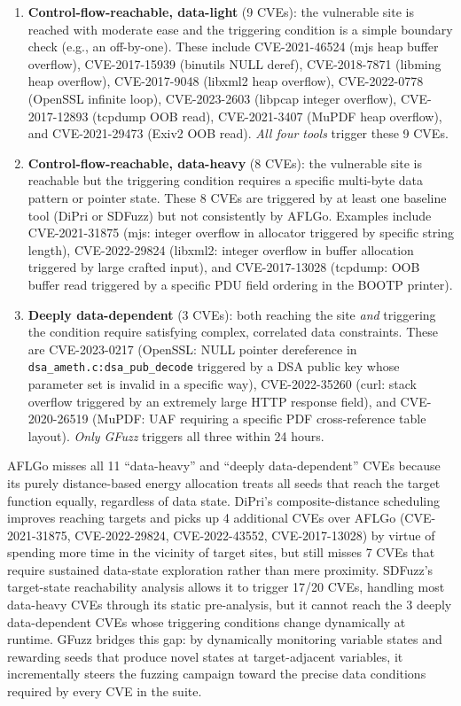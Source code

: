 \documentclass[preprint,12pt,3p]{elsarticle}
\begin{document}
\begin{enumerate}
  \item \textbf{Control-flow-reachable, data-light} (9 CVEs): the
    vulnerable site is reached with moderate ease and the triggering condition
    is a simple boundary check (e.g., an off-by-one).  These include
    CVE-2021-46524 (mjs heap buffer overflow), CVE-2017-15939 (binutils NULL deref),
    CVE-2018-7871 (libming heap overflow), CVE-2017-9048 (libxml2 heap
    overflow), CVE-2022-0778 (OpenSSL infinite loop), CVE-2023-2603
    (libpcap integer overflow), CVE-2017-12893 (tcpdump OOB read),
    CVE-2021-3407 (MuPDF heap overflow), and CVE-2021-29473 (Exiv2 OOB read).
    \emph{All four tools} trigger these 9 CVEs.

  \item \textbf{Control-flow-reachable, data-heavy} (8 CVEs): the vulnerable
    site is reachable but the triggering condition requires a specific
    multi-byte data pattern or pointer state.  These 8 CVEs are triggered by
    at least one baseline tool (DiPri or SDFuzz) but not consistently by
    AFLGo.  Examples include CVE-2021-31875 (mjs: integer overflow in
    allocator triggered by specific string length), CVE-2022-29824 (libxml2:
    integer overflow in buffer allocation triggered by large crafted input),
    and CVE-2017-13028 (tcpdump: OOB buffer read triggered by a specific PDU field ordering in the BOOTP printer).

  \item \textbf{Deeply data-dependent} (3 CVEs): both reaching the site
    \emph{and} triggering the condition require satisfying complex,
    correlated data constraints.  These are CVE-2023-0217 (OpenSSL: NULL
    pointer dereference in \texttt{dsa\_ameth.c:dsa\_pub\_decode} triggered
    by a DSA public key whose parameter set is invalid in a specific way),
    CVE-2022-35260 (curl: stack overflow triggered by an extremely
    large HTTP response field), and
    CVE-2020-26519 (MuPDF: UAF requiring a specific PDF cross-reference
    table layout).  \emph{Only GFuzz} triggers all three within 24 hours.
\end{enumerate}

AFLGo misses all 11 ``data-heavy'' and ``deeply data-dependent'' CVEs because
its purely distance-based energy allocation treats all seeds that reach the
target function equally, regardless of data state.  DiPri's composite-distance
scheduling improves reaching targets and picks up 4 additional CVEs over AFLGo
(CVE-2021-31875, CVE-2022-29824, CVE-2022-43552, CVE-2017-13028) by virtue of
spending more time in the vicinity of target sites, but still misses 7 CVEs
that require sustained data-state exploration rather than mere proximity.
SDFuzz's target-state reachability analysis allows it to trigger 17/20 CVEs,
handling most data-heavy CVEs through its static pre-analysis, but it cannot
reach the 3 deeply data-dependent CVEs whose triggering conditions change
dynamically at runtime.  GFuzz bridges this gap: by dynamically monitoring
variable states and rewarding seeds that produce novel states at target-adjacent
variables, it incrementally steers the fuzzing campaign toward the precise
data conditions required by every CVE in the suite.
\end{document}

